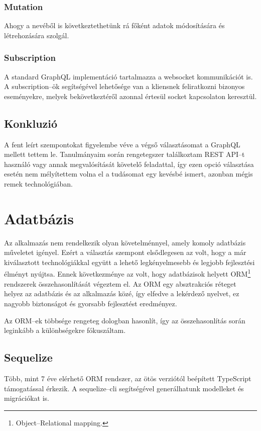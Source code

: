 \subsubsection{Mutation}
Ahogy a nevéből is következtethetünk rá főként adatok módosítására és létrehozására szolgál.
  

\subsubsection{Subscription}
A standard GraphQL implementáció tartalmazza a websocket kommunikációt is. A subscription–ök segítségével lehetősége van a kliensnek feliratkozni bizonyos eseményekre, melyek bekövetkeztéről azonnal értesül socket kapcsolaton keresztül.

\subsection{Konkluzió}
A fent leírt szempontokat figyelembe véve a végső választásomat a GraphQL mellett tettem le.
Tanulmányaim során rengetegszer találkoztam REST API–t használó vagy annak megvalósítását követelő feladattal, így ezen opció választása esetén nem mélyítettem volna el a tudásomat egy kevésbé ismert, azonban mégis remek technológiában.

\section{Adatbázis}
Az alkalmazás nem rendelkezik olyan követelménnyel, amely komoly adatbázis műveletet igényel.
Ezért a választás szempont elsődlegesen az volt, hogy a már kiválasztott technológiákkal együtt a lehető legkényelmesebb és legjobb fejlesztési élményt nyújtsa. Ennek következménye az volt, hogy adatbázisok helyett ORM\footnote{Object–Relational mapping.} rendszerek összehasonlítását végeztem el.
Az ORM egy absztrakciós réteget helyez az adatbázis és az alkalmazás közé, így elfedve a lekérdező nyelvet, ez nagyobb biztonságot és gyorsabb fejlesztést eredményez.

Az ORM–ek többsége rengeteg dologban hasonlít, így az összehasonlítás során leginkább a különbségekre fókuszáltam.

\subsection{Sequelize}
Több, mint 7 éve elérhető ORM rendszer, az ötös verziótól beépített TypeScript támogatással érkezik.
A sequelize–cli segítségével generálhatunk modelleket és migrációkat is.\cite{Sequelize}


